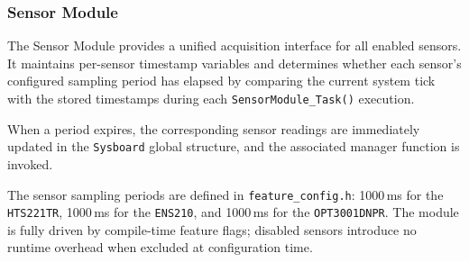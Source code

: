\subsubsection{Sensor Module}
The Sensor Module provides a unified acquisition interface for all enabled sensors. It maintains per-sensor timestamp variables and determines whether each sensor's configured sampling period has elapsed by comparing the current system tick with the stored timestamps during each \texttt{SensorModule\_Task()} execution. 

When a period expires, the corresponding sensor readings are immediately updated in the \texttt{Sysboard} global structure, and the associated manager function is invoked.

The sensor sampling periods are defined in \texttt{feature\_config.h}: 1000\,ms for the \texttt{HTS221TR}, 1000\,ms for the \texttt{ENS210}, and 1000\,ms for the \texttt{OPT3001DNPR}. The module is fully driven by compile-time feature flags; disabled sensors introduce no runtime overhead when excluded at configuration time.

